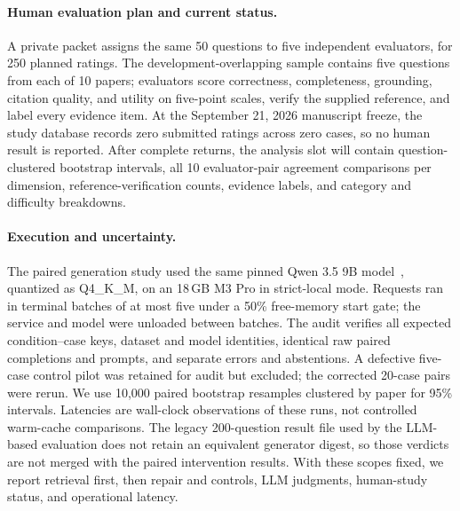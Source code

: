 \paragraph{Human evaluation plan and current status.}
A private packet assigns the same 50 questions to five independent evaluators, for 250 planned ratings. The development-overlapping sample contains five questions from each of 10 papers; evaluators score correctness, completeness, grounding, citation quality, and utility on five-point scales, verify the supplied reference, and label every evidence item. At the September 21, 2026 manuscript freeze, the study database records zero submitted ratings across zero cases, so no human result is reported. After complete returns, the analysis slot will contain question-clustered bootstrap intervals, all 10 evaluator-pair agreement comparisons per dimension, reference-verification counts, evidence labels, and category and difficulty breakdowns.

\paragraph{Execution and uncertainty.}
The paired generation study used the same pinned Qwen 3.5 9B model~\citep{qwen2026qwen35}, quantized as Q4\_K\_M, on an 18\,GB M3 Pro in strict-local mode. Requests ran in terminal batches of at most five under a 50\% free-memory start gate; the service and model were unloaded between batches. The audit verifies all expected condition--case keys, dataset and model identities, identical raw paired completions and prompts, and separate errors and abstentions. A defective five-case control pilot was retained for audit but excluded; the corrected 20-case pairs were rerun. We use 10,000 paired bootstrap resamples clustered by paper for 95\% intervals. Latencies are wall-clock observations of these runs, not controlled warm-cache comparisons. The legacy 200-question result file used by the LLM-based evaluation does not retain an equivalent generator digest, so those verdicts are not merged with the paired intervention results. With these scopes fixed, we report retrieval first, then repair and controls, LLM judgments, human-study status, and operational latency.
